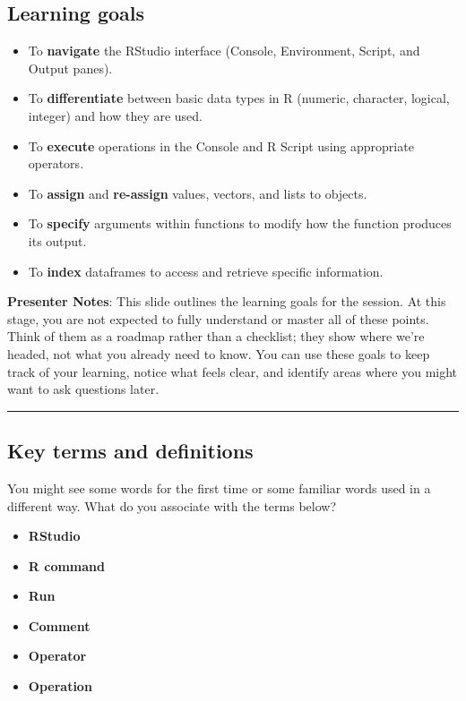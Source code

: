 \documentclass[
  letterpaper,
  DIV=11,
  numbers=noendperiod]{scrartcl}
\providecommand{\tightlist}{%
  \setlength{\itemsep}{0pt}\setlength{\parskip}{0pt}}
\begin{document}
\subsection{Learning goals}\label{learning-goals}

\begin{itemize}
\tightlist
\item
  To \textbf{navigate} the RStudio interface (Console, Environment,
  Script, and Output panes).
\item
  To \textbf{differentiate} between basic data types in R (numeric,
  character, logical, integer) and how they are used.
\item
  To \textbf{execute} operations in the Console and R Script using
  appropriate operators.
\item
  To \textbf{assign} and \textbf{re-assign} values, vectors, and lists
  to objects.
\item
  To \textbf{specify} arguments within functions to modify how the
  function produces its output.
\item
  To \textbf{index} dataframes to access and retrieve specific
  information.
\end{itemize}

\textbf{Presenter Notes}: This slide outlines the learning goals for the
session. At this stage, you are not expected to fully understand or
master all of these points. Think of them as a roadmap rather than a
checklist; they show where we're headed, not what you already need to
know. You can use these goals to keep track of your learning, notice
what feels clear, and identify areas where you might want to ask
questions later.

\begin{center}\rule{0.5\linewidth}{0.5pt}\end{center}

\subsection{Key terms and definitions}\label{key-terms-and-definitions}

You might see some words for the first time or some familiar words used
in a different way. What do you associate with the terms below?

\begin{itemize}
\tightlist
\item
  \textbf{RStudio}
\item
  \textbf{R command}
\item
  \textbf{Run}
\item
  \textbf{Comment}
\item
  \textbf{Operator}
\item
  \textbf{Operation}
\end{itemize}
\end{document}
